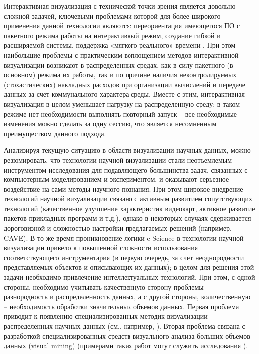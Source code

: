 Интерактивная визуализация с технической точки зрения является довольно сложной задачей, ключевыми проблемами которой для более широкого применения данной технологии являются: переориентация имеющегося ПО с пакетного режима работы на интерактивный режим, создание гибкой и расширяемой системы, поддержка «мягкого реального» времени \citep{dk68}. При этом наибольшие проблемы с практическим воплощением методов интерактивной визуализации возникают в распределенных средах, как в силу пакетного (в основном) режима их работы, так и по причине наличия неконтролируемых (стохастических) накладных расходов при организации вычислений и передаче данных за счет коммунального характера среды. Вместе с этим, интерактивная визуализация в целом уменьшает нагрузку на распределенную среду; в таком режиме нет необходимости выполнять повторный запуск – все необходимые изменения можно сделать за одну сессию, что является несомненным преимуществом данного подхода.

Анализируя текущую ситуацию в области визуализации научных данных, можно резюмировать, что технологии научной визуализации стали неотъемлемым инструментом исследования для подавляющего большинства задач, связанных с компьютерным моделированием и экспериментом, и оказывают серьезное воздействие на сами методы научного познания. При этом широкое внедрение технологий научной визуализации связано с активным развитием сопутствующих технологий (качественное улучшение характеристик видеокарт, активное развитие пакетов прикладных программ и т.д.), однако в некоторых случаях сдерживается дороговизной и сложностью настройки предлагаемых решений (например, CAVE). В то же время проникновение логики e-Science в технологии научной визуализации привело к повышенной сложности использования соответствующего инструментария (в первую очередь, за счет неоднородности представляемых объектов и описывающих их данных); в целом для решения этой задачи необходимо привлечение интеллектуальных технологий. При этом, с одной стороны, необходимо учитывать качественную сторону проблемы – разнородность и распределенность данных, а с другой стороны, количественную – необходимость обработки значительных объемов данных. Первая проблема приводит к появлению специализированных методик визуализации распределенных научных данных (см., например, \citep{dk69}\citep{dk70}). Вторая проблема связана с разработкой специализированных средств визуального анализа больших объемов данных (visual mining) (примерами таких работ могут служить исследования \citep{dk71}\citep{dk72}). 


